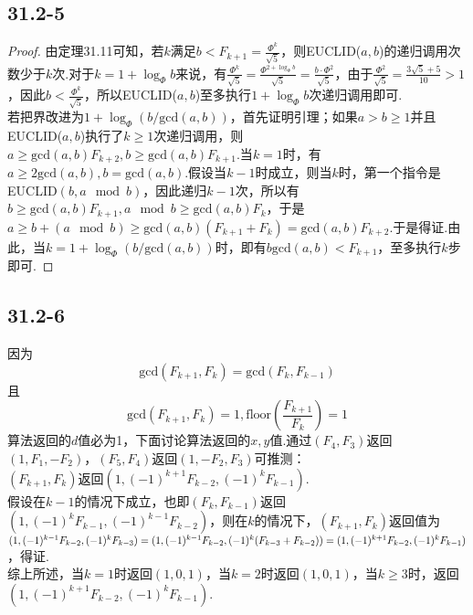 \documentclass[twocolumn]{article}
\newenvironment{SChinese}{
	\CJKfamily{gbsn}
	\CJKtilde
	\CJKnospace}{}
\begin{document}
\begin{CJK}{UTF8}{}
\begin{SChinese}
			\subsection*{31.2-5}
				\begin{proof}
					由定理31.11可知，若$k$满足$b<F_{k+1}=\frac{\Phi^k}{\sqrt{5}}$，则EUCLID($a,b$)的递归调用次数少于$k$次.对于$k=1+\log_\Phi b$来说，有$\frac{\Phi^k}{\sqrt{5}}=\frac{\Phi^{2+\log_\Phi b}}{\sqrt{5}}=\frac{b\cdot\Phi^2}{\sqrt{5}}$，由于$\frac{\Phi^2}{\sqrt{5}}=\frac{3\sqrt{5}+5}{10}>1$，因此$b<\frac{\Phi^k}{\sqrt{5}}$，所以EUCLID($a,b$)至多执行$1+\log_\Phi b$次递归调用即可.\\
					若把界改进为$1+\log_\Phi(b/\textrm{gcd}(a,b))$，首先证明引理；如果$a>b\ge1$并且EUCLID($a,b$)执行了$k\ge1$次递归调用，则$a\ge\textrm{gcd}(a,b)F_{k+2},b\ge\textrm{gcd}(a,b)F_{k+1}$.当$k=1$时，有$a\ge2\textrm{gcd}(a,b),b=\textrm{gcd}(a,b)$.假设当$k-1$时成立，则当$k$时，第一个指令是EUCLID$(b,a\mod b)$，因此递归$k-1$次，所以有$b\ge\textrm{gcd}(a,b)F_{k+1},a\mod b\ge\textrm{gcd}(a,b)F_k$，于是$a\ge b+(a\mod b)\ge\textrm{gcd}(a,b)(F_{k+1}+F_k)=\textrm{gcd}(a,b)F_{k+2}$.于是得证.由此，当$k=1+\log_\Phi(b/\textrm{gcd}(a,b))$时，即有$b\textrm{gcd}(a,b)<F_{k+1}$，至多执行$k$步即可.
				\end{proof}
			\subsection*{31.2-6}
				因为\[\textrm{gcd}(F_{k+1},F_k)=\textrm{gcd}(F_k,F_{k-1})\]且\[\textrm{gcd}(F_{k+1},F_k)=1,\textrm{floor}(\frac{F_{k+1}}{F_k})=1\]算法返回的$d$值必为1，下面讨论算法返回的$x,y$值.通过$(F_4,F_3)$返回$(1,F_1,-F_2)$，$(F_5,F_4)$返回$(1,-F_2,F_3)$可推测：\\$(F_{k+1},F_k)$返回$(1,(-1)^{k+1}F_{k-2},(-1)^kF_{k-1})$.\\假设在$k-1$的情况下成立，也即$(F_k,F_{k-1})$返回$(1,(-1)^{k}F_{k-1},(-1)^{k-1}F_{k-2})$，则在$k$的情况下，$(F_{k+1},F_k)$返回值为\\$ (1,(-1)^{k-1}F_{k-2},(-1)^kF_{k-3})\\=(1,(-1)^{k-1}F_{k-2},(-1)^k(F_{k-3}+F_{k-2}))\\=(1,(-1)^{k+1}F_{k-2},(-1)^kF_{k-1})$，得证.\\
				综上所述，当$k=1$时返回$(1,0,1)$，当$k=2$时返回$(1,0,1)$，当$k\ge3$时，返回$(1,(-1)^{k+1}F_{k-2},(-1)^kF_{k-1})$.

\end{SChinese}
\end{CJK}
\end{document}
